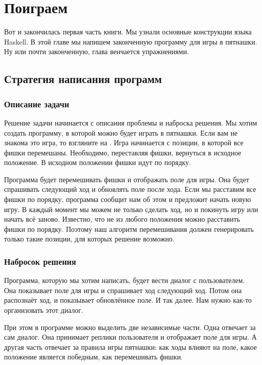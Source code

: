 \setcounter{chapter}{12}
\chapter{Поиграем}

Вот и закончилась первая часть книги. Мы узнали
основные конструкции языка Haskell. В этой главе
мы напишем законченную программу для игры в пятнашки.
Ну или почти законченную, глава венчается упражнениями.

\section{Стратегия написания программ}

\subsection{Описание задачи}

Решение задачи начинается с описания проблемы и 
наброска решения. Мы хотим создать программу, в которой можно
будет играть в пятнашки. Если вам не знакома
это игра, то взгляните на . Игра начинается
с позиции, в которой все фишки перемешаны. 
Необходимо, переставляя фишки, вернуться в исходное
положение. В исходном положении фишки идут по порядку.


Программа будет перемешивать фишки и отображать
поле для игры. Она будет спрашивать следующий ход и
обновлять поле после хода. Если мы расставим все фишки по порядку,
программа сообщит нам об этом и предложит начать
новую игру. В каждый момент мы можем не только 
сделать ход, но и покинуть игру или начать всё заново.
Известно, что не из любого положения можно расставить
фишки по порядку. Поэтому наш алгоритм перемешивания
должен генерировать только такие позиции, для которых
решение возможно.


\subsection{Набросок решения}

Программа, которую мы хотим написать, будет вести диалог
с пользователем. Она показывает поле для игры и спрашивает
ход следующий ход. Потом она распознаёт ход, и показывает обновлённое
поле. И так далее. Нам нужно как-то организовать этот диалог.

При этом в программе можно выделить две независимые части.
Одна отвечает за сам диалог. Она принимает реплики пользователя
и отображает поле для игры. А другая часть отвечает за правила
игры пятнашки: как ходы влияют на поле, какое положение является
победным, как перемешивать фишки. 

